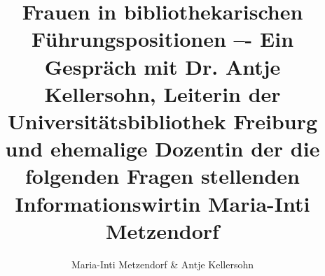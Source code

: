 
\fancyhead[R]{\thepage} %

\title{\LARGE{Frauen in bibliothekarischen Führungspositionen –- Ein Gespräch mit Dr. Antje Kellersohn, Leiterin der Universitätsbibliothek Freiburg und ehemalige Dozentin der die folgenden Fragen stellenden Informationswirtin Maria-Inti Metzendorf}} %
\author{Maria-Inti Metzendorf \& Antje Kellersohn} %